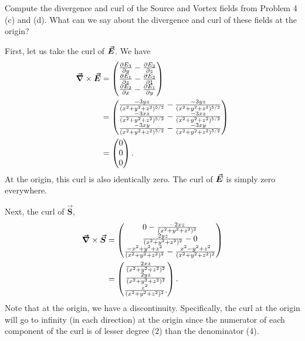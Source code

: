 \documentclass[12pt]{article} %
\begin{document}
\newpage
\begin{problem}
Compute the divergence and curl of the Source and Vortex fields from Problem 4 (c) and (d).  What can we say about the divergence and curl of these fields at the origin?
\end{problem}
\begin{solution}
    First, let us take the curl of $\boldsymbol{\vec{E}}$.  We have
    \begin{align*}
        \boldsymbol{\vec{\nabla}} \times \boldsymbol{\vec{E}} &= \begin{pmatrix} \frac{\partial E_3}{\partial y} - \frac{\partial E_2}{\partial z} \\ \frac{\partial E_1}{\partial z} -\frac{\partial E_3}{\partial 1} \\ \frac{\partial E_2}{\partial x} - \frac{\partial E_1}{\partial y} \end{pmatrix}\\
        &= \begin{pmatrix} \frac{-3yz}{(x^2+y^2+z^2)^{5/2}} - \frac{-3yz}{(x^2+y^2+z^2)^{5/2}} \\ \frac{-3xz}{(x^2+y^2+z^2)^{5/2}} - \frac{-3xz}{(x^2+y^2+z^2)^{5/2}} \\
        \frac{-3xy}{(x^2+y^2+z^2)^{5/2}} -\frac{-3xy}{(x^2+y^2+z^2)^{5/2}} \end{pmatrix}\\
        &= \begin{pmatrix} 0 \\ 0 \\ 0 \end{pmatrix}.
    \end{align*}
    At the origin, this curl is also identically zero.  The curl of $\boldsymbol{\vec{E}}$ is simply zero everywhere.
    
    Next, the curl of $\boldsymbol{\vec{S}}$,
        \begin{align*}
            \boldsymbol{\vec{\nabla}} \times \boldsymbol{\vec{S}} &= \begin{pmatrix} 0 - \frac{-2xz}{(x^2+y^2+z^2)^2} \\ \frac{2yz}{(x^2+y^2+z^2)^2} - 0 \\
            \frac{-x^2+y^2+z^2}{(x^2+y^2+z^2)^2}- \frac{x^2-y^2+z^2}{(x^2+y^2+z^2)^2}\end{pmatrix}\\
            &= \begin{pmatrix}  \frac{2xz}{(x^2+y^2+z^2)^2} \\ \frac{2yz}{(x^2+y^2+z^2)^2} \\ \frac{z^2}{(x^2+y^2+z^2)^2}. \end{pmatrix}.
        \end{align*}
    Note that at the origin, we have a discontinuity.  Specifically, the curl at the origin will go to infinity (in each direction) at the origin since the numerator of each component of the curl is of lesser degree (2) than the denominator (4).
    

\end{solution}
\end{document}
